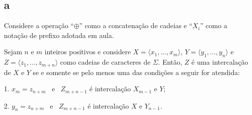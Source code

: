 \subsection{a} Considere a operação ``$\oplus$'' como a concatenação de cadeias e ``$X_i$'' como a notação de prefixo adotada em aula.

\begin{theorem}
    Sejam $n$ e $m$ inteiros positivos e considere $X = \langle x_1, \ldots, x_m \rangle$, $Y = \langle y_1, \ldots, y_n \rangle$ e $Z = \langle z_1, \ldots, z_{m + n} \rangle$ como cadeias de caracteres de $\Sigma$. Então, $Z$ é uma intercalação de $X$ e $Y$ se e somente se pelo menos uma das condições a seguir for atendida:

    1. $x_m = z_{n + m}$ ~e~ $Z_{m + n - 1}$ é intercalação $X_{m - 1}$ e $Y$;

    2. $y_n = z_{n + m}$ ~e~ $Z_{m + n - 1}$ é intercalação $X$ e $Y_{n - 1}$.
\end{theorem}

